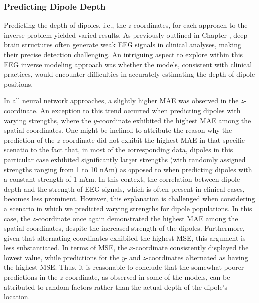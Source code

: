 \documentclass[a4paper, UKenglish, 11pt]{uiomaster}
\begin{document}

\subsubsection{Predicting Dipole Depth}
Predicting the depth of dipoles, i.e., the $z$-coordinates, for each approach to the inverse problem yielded varied results. As previously outlined in Chapter , deep brain structures often generate weak EEG signals in clinical analyses, making their precise detection challenging. An intriguing aspect to explore within this EEG inverse modeling approach was whether the models, consistent with clinical practices, would encounter difficulties in accurately estimating the depth of dipole positions.

In all neural network approaches, a slightly higher MAE was observed in the $z$-coordinate. An exception to this trend occurred when predicting dipoles with varying strengths, where the $y$-coordinate exhibited the highest MAE among the spatial coordinates. One might be inclined to attribute the reason why the prediction of the $z$-coordinate did not exhibit the highest MAE in that specific scenatio to the fact that, in most of the corresponding data, dipoles in this particular case exhibited significantly larger strengths (with randomly assigned strengths ranging from 1 to 10 nAm) as opposed to when predicting dipoles with a constant strength of 1 nAm. In this context, the correlation between dipole depth and the strength of EEG signals, which is often present in clinical cases, becomes less prominent. However, this explanation is challenged when considering a scenario in which we predicted varying strengths for dipole populations. In this case, the $z$-coordinate once again demonstrated the highest MAE among the spatial coordinates, despite the increased strength of the dipoles. Furthermore, given that alternating coordinates exhibited the highest MSE, this argument is less substantiated. In terms of MSE, the $x$-coordinate consistently displayed the lowest value, while predictions for the $y$- and $z$-coordinates alternated as having the highest MSE. Thus, it is reasonable to conclude that the somewhat poorer predictions in the $z$-coordinate, as observed in some of the models, can be attributed to random factors rather than the actual depth of the dipole's location.
\end{document}
